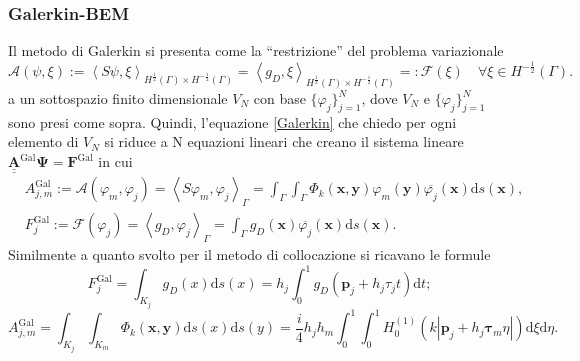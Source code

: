 \subsubsection{Galerkin-BEM}
Il metodo di Galerkin si presenta come la “restrizione” del problema variazionale
\begin{equation}
	\mathcal{A}(\psi,\xi) := \left\langle S\psi,\xi \right\rangle_{H^{\frac{1}{2}}(\Gamma) \times H^{-\frac{1}{2}}(\Gamma)} = \left\langle g_D, \xi \right\rangle_{H^{\frac{1}{2}}(\Gamma) \times H^{-\frac{1}{2}}(\Gamma)} =: \mathcal{F}(\xi) \quad \forall \xi \in H^{-\frac{1}{2}}(\Gamma).
\end{equation}
a un sottospazio finito dimensionale $V_N$ con base $\{\varphi_j\}_{j=1}^N$, dove $V_N$ e $\{\varphi_j\}_{j=1}^N$ sono presi come sopra. Quindi, l'equazione \eqref{Galerkin} che chiedo per ogni elemento di $V_N$ si riduce a N equazioni lineari che creano il sistema lineare $\underline{\underline{\textbf{A}}}^{\text{Gal}} \bm{\Psi} = \textbf{F}^{\text{Gal}}$ in cui
\begin{align}
	&A_{j,m}^{\text{Gal}} := \mathcal{A}(\varphi_m,\varphi_j) = \left\langle S\varphi_m, \varphi_j \right\rangle _\Gamma = \int_\Gamma \int_\Gamma \Phi_k(\textbf{x},\textbf{y}) \varphi_m(\textbf{y}) \overline{\varphi_j}(\textbf{x}) \mathrm{d}s(\textbf{x}), \\
	&F_j^{\text{Gal}} := \mathcal{F}(\varphi_j) = \left\langle g_D, \varphi_j \right\rangle _\Gamma = \int_\Gamma g_D(\textbf{x}) \overline{\varphi_j}(\textbf{x}) \mathrm{d}s(\textbf{x}).
\end{align}
Similmente a quanto svolto per il metodo di collocazione si ricavano le formule
\begin{equation}
	F_j^{\text{Gal}} = \int_{K_j} g_D(x) \mathrm{d}s(x) = h_j \int_0^1 g_D(\textbf{p}_j + h_j\tau_jt) \mathrm{d}t;
\end{equation}
\begin{equation}
	A_{j,m}^{\text{Gal}} = \int_{K_j}\int_{K_m} \Phi_k(\textbf{x},\textbf{y}) \mathrm{d}s(x) \mathrm{d}s(y) = \frac{i}{4} h_j h_m \int_0^1 \int_0^1 H^{(1)}_0 (k |\textbf{p}_j + h_j \bm{\tau}_m \eta|) \mathrm{d}\xi\mathrm{d}\eta.
\end{equation}
